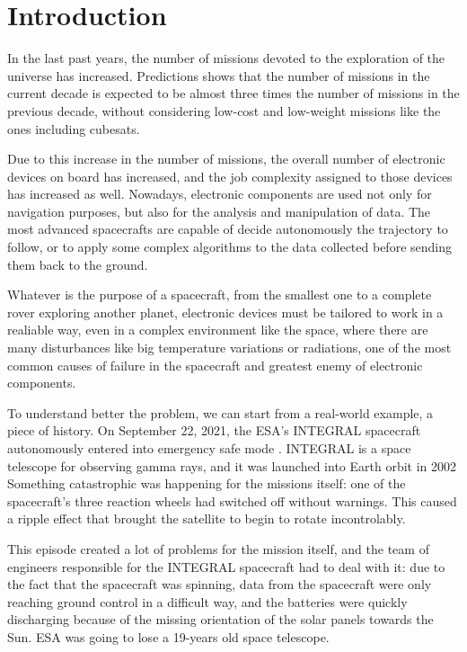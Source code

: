 \chapter{Introduction}
\label{sec:Introduction}

In the last past years, the number of missions devoted to the exploration of the universe has increased. Predictions shows that the number of missions in the current decade is expected to be almost three times the number of missions in the previous decade, without considering low-cost and low-weight missions like the ones including cubesats. \bigskip

Due to this increase in the number of missions, the overall number of electronic devices on board has increased, and the job complexity assigned to those devices has increased as well. Nowadays, electronic components are used not only for navigation purposes, but also for the analysis and manipulation of data. The most advanced spacecrafts are capable of decide autonomously the trajectory to follow, or to apply some complex algorithms to the data collected before sending them back to the ground. \bigskip

Whatever is the purpose of a spacecraft, from the smallest one to a complete rover exploring another planet, electronic devices must be tailored to work in a realiable way, even in a complex environment like the space, where there are many disturbances like big temperature variations or radiations, one of the most common causes of failure in the spacecraft and greatest enemy of electronic components. \bigskip

To understand better the problem, we can start from a real-world example, a piece of history. On September 22, 2021, the ESA's INTEGRAL spacecraft autonomously entered into emergency safe mode \cite{ESA:INTEGRAL}. INTEGRAL is a space telescope for observing gamma rays, and it was launched into Earth orbit in 2002 Something catastrophic was happening for the missions itself: one of the spacecraft's three reaction wheels had switched off without warnings. This caused a ripple effect that brought the satellite to begin to rotate incontrolably. \bigskip

This episode created a lot of problems for the mission itself, and the team of engineers responsible for the INTEGRAL spacecraft had to deal with it: due to the fact that the spacecraft was spinning, data from the spacecraft were only reaching ground control in a difficult way, and the batteries were quickly discharging because of the missing orientation of the solar panels towards the Sun. ESA was going to lose a 19-years old space telescope. \bigskip

